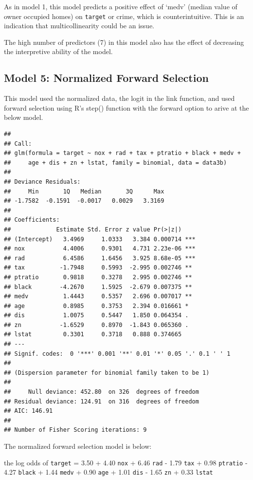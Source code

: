 \documentclass[]{article}
\begin{document}
As in model 1, this model predicts a positive effect of `medv' (median
value of owner occupied homes) on \texttt{target} or crime, which is
counterintuitive. This is an indication that multicollinearity could be
an issue.

The high number of predictors (7) in this model also has the effect of
decreasing the interpretive ability of the model.

\subsection{Model 5: Normalized Forward
Selection}\label{model-5-normalized-forward-selection}

This model used the normalized data, the logit in the link function, and
used forward selection using R's step() function with the forward option
to arive at the below model.

\begin{verbatim}
## 
## Call:
## glm(formula = target ~ nox + rad + tax + ptratio + black + medv + 
##     age + dis + zn + lstat, family = binomial, data = data3b)
## 
## Deviance Residuals: 
##     Min       1Q   Median       3Q      Max  
## -1.7582  -0.1591  -0.0017   0.0029   3.3169  
## 
## Coefficients:
##             Estimate Std. Error z value Pr(>|z|)    
## (Intercept)   3.4969     1.0333   3.384 0.000714 ***
## nox           4.4006     0.9301   4.731 2.23e-06 ***
## rad           6.4586     1.6456   3.925 8.68e-05 ***
## tax          -1.7948     0.5993  -2.995 0.002746 ** 
## ptratio       0.9818     0.3278   2.995 0.002746 ** 
## black        -4.2670     1.5925  -2.679 0.007375 ** 
## medv          1.4443     0.5357   2.696 0.007017 ** 
## age           0.8985     0.3753   2.394 0.016661 *  
## dis           1.0075     0.5447   1.850 0.064354 .  
## zn           -1.6529     0.8970  -1.843 0.065360 .  
## lstat         0.3301     0.3718   0.888 0.374665    
## ---
## Signif. codes:  0 '***' 0.001 '**' 0.01 '*' 0.05 '.' 0.1 ' ' 1
## 
## (Dispersion parameter for binomial family taken to be 1)
## 
##     Null deviance: 452.80  on 326  degrees of freedom
## Residual deviance: 124.91  on 316  degrees of freedom
## AIC: 146.91
## 
## Number of Fisher Scoring iterations: 9
\end{verbatim}

The normalized forward selection model is below:

the log odds of \texttt{target} = 3.50 + 4.40 \texttt{nox} + 6.46
\texttt{rad} - 1.79 \texttt{tax} + 0.98 \texttt{ptratio} - 4.27
\texttt{black} + 1.44 \texttt{medv} + 0.90 \texttt{age} + 1.01
\texttt{dis} - 1.65 \texttt{zn} + 0.33 \texttt{lstat}
\end{document}
